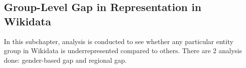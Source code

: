 \subsection{Group-Level Gap in Representation in Wikidata}

In this subchapter, analysis is conducted to see whether any particular entity group in Wikidata is underrepresented compared to others. There are 2 analysis done: gender-based gap and regional gap.




